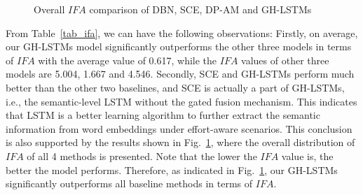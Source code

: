 \documentclass[journal]{IEEEtran}
\begin{document}
\begin{figure}
\begin{minipage}[b]{.45\textwidth}
		\caption{Overall $IFA$ comparison of DBN, SCE, DP-AM and GH-LSTMs}
		\label{fig_box_IFA}
\end{minipage}
\end{figure}




From Table~\ref{tab_ifa}, we can have the following observations: Firstly, on average, our GH-LSTMs model significantly outperforms the other three models in terms of $IFA$ with the average value of 0.617, while the $IFA$ values of other three models are 5.004, 1.667 and 4.546. Secondly, SCE and GH-LSTMs perform much better than the other two baselines, and SCE is actually a part of GH-LSTMs, i.e., the semantic-level LSTM without the gated fusion mechanism. This indicates that LSTM is a better learning algorithm to further extract the semantic information from word embeddings under effort-aware scenarios. This conclusion is also supported by the results shown in Fig.~\ref{fig_box_IFA}, where the overall distribution of $IFA$ of all 4 methods is presented. Note that the lower the $IFA$ value is, the better the model performs. Therefore, as indicated in Fig.~\ref{fig_box_IFA}, our GH-LSTMs significantly outperforms all baseline methods in terms of $IFA$.
\end{document}
